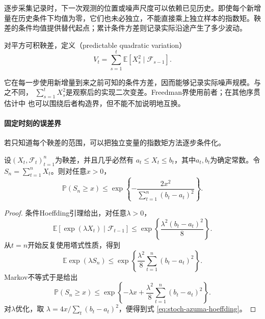逐步采集记录时，下一次观测的位置或噪声尺度可以依赖已见历史。即使每个新增量在历史条件下均值为零，它们也未必独立，不能直接乘上独立样本的指数矩。鞅差的条件均值提供替代起点；累计条件方差则记录实际沿途产生了多少波动。
\begin{definition}[可预测二次变差]
  \label{def:stoch-predictable-quadratic-variation}
对平方可积鞅差，定义（predictable quadratic variation）
\begin{equation}
  V_t=\sum_{s=1}^{t}\mathbb{E}[X_s^2\mid\mathcal{F}_{s-1}].
  \label{eq:stoch-predictable-quadratic-variation}
\end{equation}
\end{definition}
它在每一步使用新增量到来之前可知的条件方差，因而能够记录实际噪声规模。与之不同，
$\sum_{s=1}^{t}X_s^2$是观察后的实现二次变差。Freedman界使用前者；在其他序贯估计中
也可以围绕后者构造界，但不能不加说明地互换。

\paragraph{固定时刻的误差界}
\label{sec:rv-fixed-time}
若只知道每个鞅差的范围，可以把独立变量的指数矩方法逐步条件化。

\begin{theorem}
  \label{thm:stoch-azuma-hoeffding}
  设$(X_t,\mathcal{F}_t)_{t=1}^{n}$为鞅差，并且几乎必然有
  $a_t\leq X_t\leq b_t$，其中$a_t,b_t$为确定常数。令
  $S_n=\sum_{t=1}^{n}X_t$。则对任意$x>0$，
  \begin{equation}
    \mathbb{P}(S_n\geq x)\leq\exp\left\{
      -\frac{2x^2}{\sum_{t=1}^{n}(b_t-a_t)^2}
    \right\}.
    \label{eq:stoch-azuma-hoeffding}
  \end{equation}
\end{theorem}

\begin{proof}
条件Hoeffding引理给出，对任意$\lambda>0$，
\[
  \mathbb{E}[
    \exp(\lambda X_t)
    \mid\mathcal{F}_{t-1}]
  \leq
  \exp\left\{
    \frac{\lambda^2(b_t-a_t)^2}{8}
  \right\}.
\]
从$t=n$开始反复使用塔式性质，得到
\[
  \mathbb{E}\exp(\lambda S_n)
  \leq
  \exp\left\{
    \frac{\lambda^2}{8}
    \sum_{t=1}^{n}(b_t-a_t)^2
  \right\}.
\]
Markov不等式于是给出
\[
  \mathbb{P}(S_n\geq x)
  \leq
  \exp\left\{
    -\lambda x+
    \frac{\lambda^2}{8}
    \sum_{t=1}^{n}(b_t-a_t)^2
  \right\}.
\]
对$\lambda$优化，取
$\lambda=4x/\sum_t(b_t-a_t)^2$，便得到式
\eqref{eq:stoch-azuma-hoeffding}。
\end{proof}

